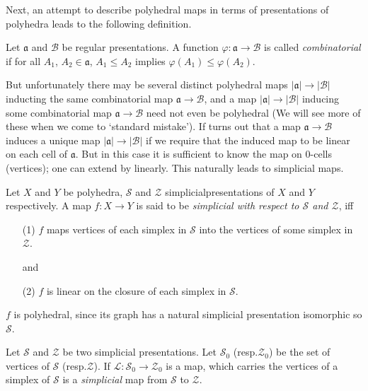 Next, an attempt to describe polyhedral maps in terms of presentations of polyhedra leads to the following definition.

\begin{definition}\label{chap2-defi2.2.1}
Let $\mathfrak{a}$ and $\mathscr{B}$ be regular presentations. A function $\varphi:\mathfrak{a}\to \mathscr{B}$ is called {\em combinatorial} if for all $A_{1}$, $A_{2}\in \mathfrak{a}$, $A_{1}\leq A_{2}$ implies $\varphi(A_{1})\leq \varphi(A_{2})$. 
\end{definition}

But unfortunately there may be several distinct polyhedral maps $|\mathfrak{a}|\to |\mathscr{B}|$ inducting the same combinatorial map $\mathfrak{a}\to \mathscr{B}$, and a map $|\mathfrak{a}|\to |\mathscr{B}|$ inducing some combinatorial map $\mathfrak{a}\to \mathscr{B}$ need not even be polyhedral (We will see more of these when we come to `standard mistake'). If turns out that a map $\mathfrak{a}\to \mathscr{B}$ induces a unique map $|\mathfrak{a}|\to |\mathscr{B}|$ if we require that the induced map to be linear on each cell of $\mathfrak{a}$. But in this case it is sufficient to know the map on $0$-cells (vertices); one can extend by linearly. This naturally leads to simplicial maps.

\begin{definition}\label{chap2-defi2.2.2}
Let $X$ and $Y$ be polyhedra, $\mathscr{S}$ and $\mathscr{Z}$ simplicial\pageoriginale presentations of $X$ and $Y$ respectively. A map $f:X\to Y$ is said to be {\em simplicial with respect to $\mathscr{S}$ and $\mathscr{Z}$}, iff
\begin{itemize}
\item[(1)] $f$ maps vertices of each simplex in $\mathscr{S}$
into the vertices of some simplex in $\mathscr{Z}$. 

and

\item[(2)] $f$ is linear on the closure of each simplex in $\mathscr{S}$.
\end{itemize}

$f$ is polyhedral, since its graph has a natural simplicial presentation isomorphic so $\mathscr{S}$.
\end{definition}

Let $\mathscr{S}$ and $\mathscr{Z}$ be two simplicial presentations. Let $\mathscr{S}_{0}$ (resp.\@ $\mathscr{Z}_{0}$) be the set of vertices of $\mathscr{S}$ (resp.\@ $\mathscr{Z}$). If $\mathscr{L}:\mathscr{S}_{0}\to \mathscr{Z}_{0}$ is a map, which carries the vertices of a simplex of $\mathscr{S}$ is a {\em simplicial} map from $\mathscr{S}$ to $\mathscr{Z}$.

